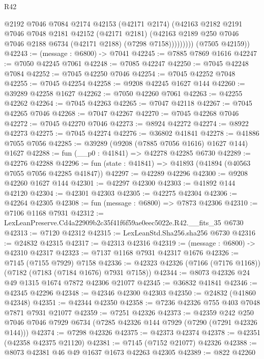 \begin{lexlean}{R42}
\begin{coremodule}
{                  @2192
                  @7046
                  @7084
                  @2174
                  @42153
                  (@42171 @2174)
                  (@42163
                    @2182
                    @2191
                    @7046
                    @7048
                    @2181
                    @42152
                    (@42171 @2181)
                    (@42163 @2189 @250 @7046 @7046 @2188 @6734 (@42171 @2188) (@7298 @7158)))))))))
      (@7505 @42159))
@42243 := (message : @6800) -> @7041
@42245 := @7885 @7869 @1616
@42247 := @7050 @42245 @7061
@42248 := @7085 @42247
@42250 := @7045 @42248 @7084
@42252 := @7045 @42250 @7046
@42254 := @7045 @42252 @7048
@42255 := @7045 @42254
@42258 := @9208 @42245 @1627 @144
@42260 := @39289 @42258 @1627
@42262 := @7050 @42260 @7061
@42263 := @42255 @42262
@42264 := @7045 @42263
@42265 := @7047 @42118
@42267 := @7045 @42265 @7046
@42268 := @7047 @42267
@42270 := @7045 @42268 @7046
@42272 := @7045 @42270 @7046
@42273 := @8924 @42272
@42274 := @8922 @42273
@42275 := @7045 @42274
@42276 := @36802 @41841
@42278 := @41886 @7055 @7056
@42285 := @39289 (@9208 (@7885 @7056 @1616) @1627 @144) @1627
@42288 := fun (__p0 : @41841) => @42278 @42285 @6730
@42289 := @42276 @42288
@42296 := fun (state : @41841) => @41893 (@41894 (@40563 @7055 @7056 @42285 @41847))
@42297 := @42289 @42296
@42300 := @9208 @42260 @1627 @144
@42301 := @42297 @42300
@42303 := @41892 @144 @42120
@42304 := @42301 @42303
@42305 := @42275 @42304
@42306 := @42264 @42305
@42308 := fun (message : @6800) => @7873 @42306
@42310 := @7106 @1168 @7931
@42312 := LexLeanPreserve.Cd4a22909b2c35f41f6f59ae0eec5022e.R42.__fits_35 @6730
@42313 := @7120 @42312
@42315 := LexLeanStd.Sha256.sha256 @6730
@42316 := @24832 @42315
@42317 := @42313 @42316
@42319 := (message : @6800) -> @42310 @42317
@42323 := @7137 @1168 @7931 @42317 @1676
@42326 := @7145 (@7155 @7929) @7158
@42336 := @42323 @42326 (@7166 (@7176 @1168)) (@7182 (@7183 (@7184 @1676) @7931 @7158))
@42344 := @8073 @42326 @24 @49 @1315 @1674 @7872 @42306 @21077
@42345 := @36832 @41841
@42346 := @42345 @42296
@42348 := @42346 @42300 @42303
@42350 := @24832 (@41860 @42348)
@42351 := @42344 @42350
@42358 := @7236 @42326 @755 @403 @7048 @7871 @7931 @21077
@42359 := @7251 @42326
@42373 := @42359
    @242
    @250
    @7046
    @7046
    @7929
    @6734
    (@7285 @42326 @144 @7929 (@7290 (@7291 @42326 @144)))
@42374 := @7298 @42326
@42375 := @42373 @42374
@42378 := @42351 (@42358 @42375 @21120)
@42381 := @7145 (@7152 @21077) @42326
@42388 := @8073 @42381 @46 @49 @1637 @1673 @42263 @42305
@42389 := @822 @42260
}
\end{coremodule}
\end{lexlean}
